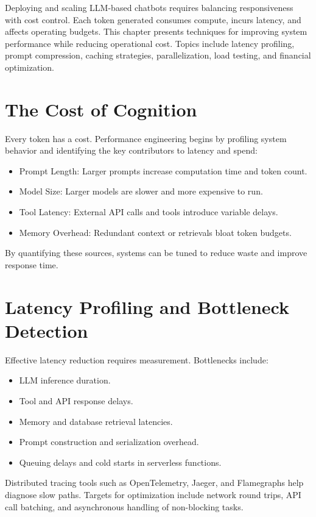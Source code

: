 \documentclass{book}
\begin{document}
Deploying and scaling LLM-based chatbots requires balancing responsiveness with cost control. Each token generated consumes compute, incurs latency, and affects operating budgets. This chapter presents techniques for improving system performance while reducing operational cost. Topics include latency profiling, prompt compression, caching strategies, parallelization, load testing, and financial optimization.

\section{The Cost of Cognition}

Every token has a cost. Performance engineering begins by profiling system behavior and identifying the key contributors to latency and spend:

\begin{itemize}
  \item Prompt Length: Larger prompts increase computation time and token count.
  \item Model Size: Larger models are slower and more expensive to run.
  \item Tool Latency: External API calls and tools introduce variable delays.
  \item Memory Overhead: Redundant context or retrievals bloat token budgets.
\end{itemize}

By quantifying these sources, systems can be tuned to reduce waste and improve response time.

\section{Latency Profiling and Bottleneck Detection}

Effective latency reduction requires measurement. Bottlenecks include:

\begin{itemize}
  \item LLM inference duration.
  \item Tool and API response delays.
  \item Memory and database retrieval latencies.
  \item Prompt construction and serialization overhead.
  \item Queuing delays and cold starts in serverless functions.
\end{itemize}

Distributed tracing tools such as OpenTelemetry, Jaeger, and Flamegraphs help diagnose slow paths. Targets for optimization include network round trips, API call batching, and asynchronous handling of non-blocking tasks.
\end{document}

